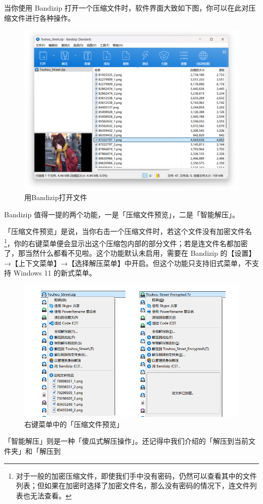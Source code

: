 {当你使用 Bandizip 打开一个压缩文件时，软件界面大致如下图，你可以在此对压缩文件进行各种操作。

\begin{figure}[htb!]
  \centering
  \includegraphics[width=.65\textwidth]{assets/software/Bandizip_opening_archive.png}
  \caption{用Bandizip打开文件}
  \label{fig:Bandizip_opening_archive}
\end{figure}

Bandizip 值得一提的两个功能，一是「压缩文件预览」，二是「智能解压」。

「压缩文件预览」是说，当你右击一个压缩文件时，若这个文件没有加密文件名\footnote{对于一般的加密压缩文件，即使我们手中没有密码，仍然可以查看其中的文件列表；但如果在加密时选择了加密文件名，那么没有密码的情况下，连文件列表也无法查看。}，你的右键菜单便会显示出这个压缩包内部的部分文件；若是连文件名都加密了，那当然什么都看不见啦。这个功能默认未启用，需要在 Bandizip 的【设置】→【上下文菜单】→【选择解压菜单】中开启。但这个功能只支持旧式菜单，不支持 Windows 11 的新式菜单。

\begin{figure}[htb!]
  \centering
  \includegraphics[width=.7\textwidth]{assets/software/Compressed_Preview.png}
  \caption{右键菜单中的「压缩文件预览」}
  \label{fig:Compressed_Preview}
\end{figure}

「智能解压」则是一种「傻瓜式解压操作」。还记得中我们介绍的「解压到当前文件夹」和「解压到 }
